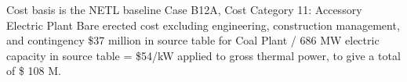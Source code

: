 Cost basis is the NETL baseline Case B12A, Cost Category 11: Accessory Electric Plant Bare erected cost excluding engineering, construction management, and contingency \$37 million in source table for Coal Plant / 686 MW electric capacity in source table = \$54/kW applied to gross  thermal power, to give a total of \$ 108 M.